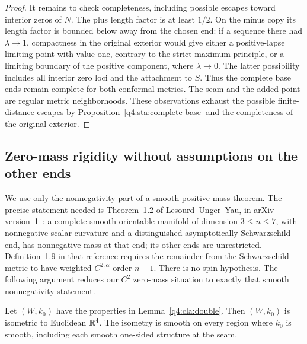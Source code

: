 \begin{proof}
It remains to check completeness, including possible escapes toward
interior zeros of $N$.  The plus length factor is at least $1/2$.
On the minus copy its length factor is bounded below away from the
chosen end: if a sequence there had $\lambda\to1$, compactness in
the original exterior would give either a positive-lapse limiting
point with value one, contrary to the strict maximum principle, or
a limiting boundary of the positive component, where $\lambda\to0$.
The latter possibility includes all interior zero loci and the
attachment to $S$.  Thus the complete base ends remain complete for
both conformal metrics.  The seam and the added point are regular
metric neighborhoods.  These observations exhaust the possible
finite-distance escapes by Proposition~\ref{q4:sta:complete-base} and
the completeness of the original exterior.
\end{proof}

\subsection{Zero-mass rigidity without assumptions on the other ends}

We use only the nonnegativity part of a smooth positive-mass theorem.
The precise statement needed is
Theorem~1.2 of Lesourd--Unger--Yau, in arXiv version~1~\cite{LesourdUngerYau2021}:
a complete smooth orientable manifold of dimension $3\le n\le7$,
with nonnegative scalar curvature and a distinguished asymptotically
Schwarzschild end, has nonnegative mass at that end; its other ends
are unrestricted.  Definition~1.9 in that reference requires the
remainder from the Schwarzschild metric to have weighted
$C^{2,\alpha}$ order $n-1$.  There is no spin hypothesis.
The following argument reduces our $C^2$ zero-mass situation to
exactly that smooth nonnegativity statement.

\begin{lemma}
\label{q4:cla:zero-mass}
Let $(W,k_0)$ have the properties in Lemma~\ref{q4:cla:double}.
Then $(W,k_0)$ is isometric to Euclidean $\mathbb R^4$.
The isometry is smooth on every region where $k_0$ is smooth,
including each smooth one-sided structure at the seam.
\end{lemma}

